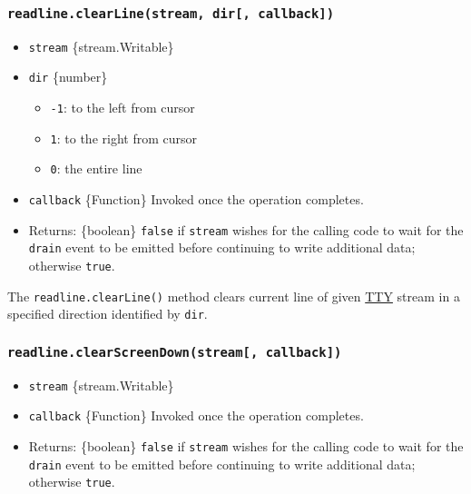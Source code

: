 \subsubsection{\texorpdfstring{\texttt{readline.clearLine(stream,\ dir{[},\ callback{]})}}{readline.clearLine(stream, dir{[}, callback{]})}}\label{readline.clearlinestream-dir-callback}

\begin{itemize}
\tightlist
\item
  \texttt{stream} \{stream.Writable\}
\item
  \texttt{dir} \{number\}

  \begin{itemize}
  \tightlist
  \item
    \texttt{-1}: to the left from cursor
  \item
    \texttt{1}: to the right from cursor
  \item
    \texttt{0}: the entire line
  \end{itemize}
\item
  \texttt{callback} \{Function\} Invoked once the operation completes.
\item
  Returns: \{boolean\} \texttt{false} if \texttt{stream} wishes for the
  calling code to wait for the
  \texttt{\textquotesingle{}drain\textquotesingle{}} event to be emitted
  before continuing to write additional data; otherwise \texttt{true}.
\end{itemize}

The \texttt{readline.clearLine()} method clears current line of given
\href{tty.md}{TTY} stream in a specified direction identified by
\texttt{dir}.

\subsubsection{\texorpdfstring{\texttt{readline.clearScreenDown(stream{[},\ callback{]})}}{readline.clearScreenDown(stream{[}, callback{]})}}\label{readline.clearscreendownstream-callback}

\begin{itemize}
\tightlist
\item
  \texttt{stream} \{stream.Writable\}
\item
  \texttt{callback} \{Function\} Invoked once the operation completes.
\item
  Returns: \{boolean\} \texttt{false} if \texttt{stream} wishes for the
  calling code to wait for the
  \texttt{\textquotesingle{}drain\textquotesingle{}} event to be emitted
  before continuing to write additional data; otherwise \texttt{true}.
\end{itemize}

